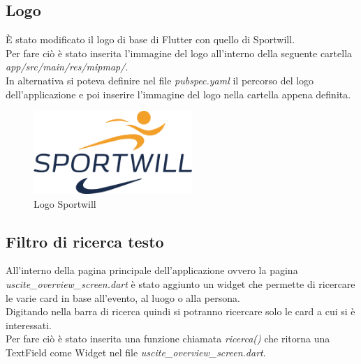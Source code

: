 \subsection{Logo}
È stato modificato il logo di base di Flutter con quello di Sportwill.\\
Per  fare ciò è stato inserita l'immagine del logo all'interno della seguente cartella \textit{app/src/main/res/mipmap/}.\\
In alternativa si poteva definire nel file \textit{pubspec.yaml} il percorso del logo dell'applicazione e poi inserire l'immagine del logo nella cartella appena definita.\\

\begin{figure}[htbp]	
	\centering
	\includegraphics[width=6cm]{immagini/logosportwill.png}
	\caption{Logo Sportwill}
	\label{fig:Logo Sportwill}
\end{figure}

\newpage

\subsection{Filtro di ricerca testo}
All'interno della pagina principale dell'applicazione ovvero la pagina \textit{uscite\_overview\_screen.dart} è stato aggiunto un widget che permette di ricercare le varie card in base all'evento, al luogo o alla persona.\\
Digitando nella barra di ricerca quindi si potranno ricercare solo le card a cui si è interessati.\\
Per fare ciò è stato inserita una funzione chiamata \textit{ricerca()} che ritorna una TextField come Widget nel file \textit{uscite\_overview\_screen.dart}.\\


